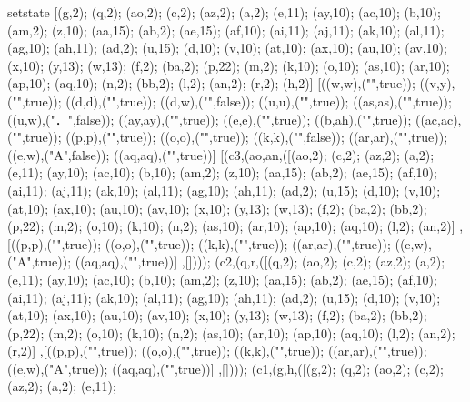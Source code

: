 setstate [(g,2); (q,2); (ao,2); (c,2); (az,2); (a,2); (e,11); (ay,10); (ac,10); (b,10); (am,2); (z,10); (aa,15); (ab,2); (ae,15); (af,10); (ai,11); (aj,11); (ak,10); (al,11); (ag,10); (ah,11); (ad,2); (u,15); (d,10); (v,10); (at,10); (ax,10); (au,10); (av,10); (x,10); (y,13); (w,13); (f,2); (ba,2); (p,22); (m,2); (k,10); (o,10); (as,10); (ar,10); (ap,10); (aq,10); (n,2); (bb,2); (l,2); (an,2); (r,2); (h,2)] [((w,w),("",true)); ((v,y),("",true)); ((d,d),("",true)); ((d,w),("",false)); ((u,u),("\mrot{\iterstar{i∈[0\upto32)\uplusminus{\tt i}}．{}\\{} \smallbin{i}{U_i}}",true)); ((as,as),("",true)); ((u,w),("．",false)); ((ay,ay),("",true)); ((e,e),("",true)); ((b,ah),("",true)); ((ac,ac),("",true)); ((p,p),("",true)); ((o,o),("\mrot{{\tt i}∈[2\upto32)}",true)); ((k,k),("",false)); ((ar,ar),("",true)); ((e,w),("\state A",false)); ((aq,aq),("",true))] [(c3,(ao,an,([(ao,2); (c,2); (az,2); (a,2); (e,11); (ay,10); (ac,10); (b,10); (am,2); (z,10); (aa,15); (ab,2); (ae,15); (af,10); (ai,11); (aj,11); (ak,10); (al,11); (ag,10); (ah,11); (ad,2); (u,15); (d,10); (v,10); (at,10); (ax,10); (au,10); (av,10); (x,10); (y,13); (w,13); (f,2); (ba,2); (bb,2); (p,22); (m,2); (o,10); (k,10); (n,2); (as,10); (ar,10); (ap,10); (aq,10); (l,2); (an,2)] ,[((p,p),("\mrot{∀i∈[0\upto32-{\tt idx})．{}\\{}{\tt smallbits}_{[i]} = {}\\{} {\tt smallmap}_{[i+{\tt idx}]}}",true)); ((o,o),("",true)); ((k,k),("",true)); ((ar,ar),("",true)); ((e,w),("\state A",true)); ((aq,aq),("",true))] ,[]))); (c2,(q,r,([(q,2); (ao,2); (c,2); (az,2); (a,2); (e,11); (ay,10); (ac,10); (b,10); (am,2); (z,10); (aa,15); (ab,2); (ae,15); (af,10); (ai,11); (aj,11); (ak,10); (al,11); (ag,10); (ah,11); (ad,2); (u,15); (d,10); (v,10); (at,10); (ax,10); (au,10); (av,10); (x,10); (y,13); (w,13); (f,2); (ba,2); (bb,2); (p,22); (m,2); (o,10); (k,10); (n,2); (as,10); (ar,10); (ap,10); (aq,10); (l,2); (an,2); (r,2)] ,[((p,p),("\mrot{∀i∈[0\upto32-{\tt idx})．{}\\{}{\tt smallbits}_{[i]} = {}\\{} {\tt smallmap}_{[i+{\tt idx}]}}",true)); ((o,o),("",true)); ((k,k),("",true)); ((ar,ar),("",true)); ((e,w),("\state A",true)); ((aq,aq),("",true))] ,[]))); (c1,(g,h,([(g,2); (q,2); (ao,2); (c,2); (az,2); (a,2); (e,11); 